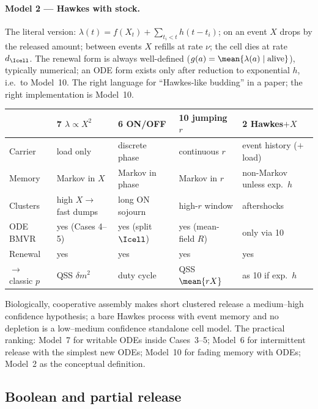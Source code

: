 \paragraph{Model 2 --- Hawkes with stock.} The literal version:
$\lambda(t)=f(X_t)+\sum_{t_i<t}h(t-t_i)$; on an event $X$ drops by the
released amount; between events $X$ refills at rate $\nu$; the cell dies at
rate $d_{\Icell}$. The renewal form is always well-defined
($g(a)=\mean{\lambda(a)\mid\text{alive}}$), typically numerical; an ODE
form exists only after reduction to exponential $h$, i.e.\ to
Model~10. The right language for ``Hawkes-like budding'' in a paper; the
right implementation is Model~10.

\begin{center}
\renewcommand{\arraystretch}{1.2}
\small
\begin{tabular}{@{}p{}p{}p{}p{}p{}@{}}
\toprule
 & \textbf{7} $\lambda\propto X^2$ & \textbf{6} ON/OFF & \textbf{10} jumping $r$ & \textbf{2} Hawkes$+X$ \\
\midrule
Carrier & load only & discrete phase & continuous $r$ & event history ($+$load) \\
Memory & Markov in $X$ & Markov in phase & Markov in $r$ & non-Markov unless exp.\ $h$ \\
Clusters & high $X\to$ fast dumps & long ON sojourn & high-$r$ window & aftershocks \\
ODE BMVR & yes (Cases 4--5) & yes (split $\Icell$) & yes (mean-field $R$) & only via 10 \\
Renewal & yes & yes & yes & yes \\
$\to$ classic $p$ & QSS $\delta m^2$ & duty cycle & QSS $\mean{rX}$ & as 10 if exp.\ $h$ \\
\bottomrule
\end{tabular}
\end{center}
Biologically, cooperative assembly makes short clustered release a
medium--high confidence hypothesis; a bare Hawkes process with event memory
and no depletion is a low--medium confidence standalone cell model. The
practical ranking: Model~7 for writable ODEs inside Cases~3--5; Model~6 for
intermittent release with the simplest new ODEs; Model~10 for fading memory
with ODEs; Model~2 as the conceptual definition.

\subsection{Boolean and partial release}
\label{sec:boolean}

